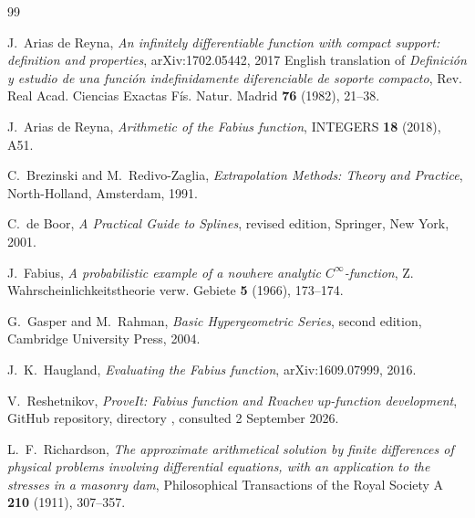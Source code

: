 \documentclass[11pt,a4paper]{article}
\theoremstyle{remark}
\begin{document}
\begin{thebibliography}{99}

J.~Arias de Reyna,
\emph{An infinitely differentiable function with compact support: definition
and properties}, arXiv:1702.05442, 2017 English translation of
\emph{Definici\'on y estudio de una funci\'on indefinidamente diferenciable de
soporte compacto}, Rev. Real Acad. Ciencias Exactas F\'is. Natur. Madrid
\textbf{76} (1982), 21--38.

J.~Arias de Reyna,
\emph{Arithmetic of the Fabius function},
INTEGERS \textbf{18} (2018), A51.

C.~Brezinski and M.~Redivo-Zaglia,
\emph{Extrapolation Methods: Theory and Practice},
North-Holland, Amsterdam, 1991.

C.~de Boor,
\emph{A Practical Guide to Splines}, revised edition,
Springer, New York, 2001.

J.~Fabius,
\emph{A probabilistic example of a nowhere analytic $C^\infty$-function},
Z. Wahrscheinlichkeitstheorie verw. Gebiete \textbf{5} (1966), 173--174.

G.~Gasper and M.~Rahman,
\emph{Basic Hypergeometric Series}, second edition,
Cambridge University Press, 2004.

J.~K.~Haugland,
\emph{Evaluating the Fabius function}, arXiv:1609.07999, 2016.

V.~Reshetnikov,
\emph{ProveIt: Fabius function and Rvachev up-function development},
GitHub repository, directory
, consulted 2 September 2026.

L.~F.~Richardson,
\emph{The approximate arithmetical solution by finite differences of physical
problems involving differential equations, with an application to the stresses
in a masonry dam},
Philosophical Transactions of the Royal Society A \textbf{210} (1911),
307--357.

\end{thebibliography}
\end{document}
